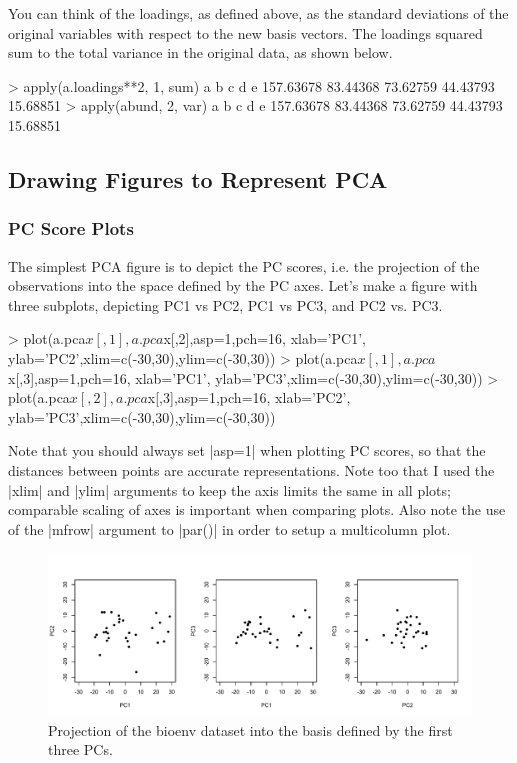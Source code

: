 You can think of the loadings, as defined above, as the standard deviations of the original variables with respect to the new basis vectors.  The loadings squared sum to the total variance in the original data, as shown below.
\begin{R}
> apply(a.loadings**2, 1, sum)
        a         b         c         d         e
157.63678  83.44368  73.62759  44.43793  15.68851
> apply(abund, 2, var)
        a         b         c         d         e
157.63678  83.44368  73.62759  44.43793  15.68851
\end{R}

\subsection{Drawing Figures to Represent PCA}

\subsubsection{PC Score Plots}

The simplest PCA figure is to depict the PC scores, i.e. the projection of the observations into the space defined by the PC axes. Let's make a figure with three subplots, depicting PC1 vs PC2, PC1 vs PC3, and PC2 vs. PC3.
\begin{R}
> plot(a.pca$x[,1], a.pca$x[,2],asp=1,pch=16, xlab='PC1', ylab='PC2',xlim=c(-30,30),ylim=c(-30,30))
> plot(a.pca$x[,1], a.pca$x[,3],asp=1,pch=16, xlab='PC1', ylab='PC3',xlim=c(-30,30),ylim=c(-30,30))
> plot(a.pca$x[,2], a.pca$x[,3],asp=1,pch=16, xlab='PC2', ylab='PC3',xlim=c(-30,30),ylim=c(-30,30))
\end{R}
Note that you should always set |asp=1| when plotting PC scores, so that the distances between points are accurate representations. Note too that I used the |xlim| and |ylim| arguments to keep the axis limits the same in all plots; comparable scaling of axes is important when comparing plots. Also note the use of the |mfrow| argument to |par()| in order to setup a multicolumn plot.

\begin{figure}[htbp]
\centering
\includegraphics[width=0.95\columnwidth]{./figures/hands-on5/bioenv-scores.pdf}
\caption{Projection of the bioenv dataset into the basis defined by the first three PCs.}\label{fig:bioenvscore}
\end{figure}


